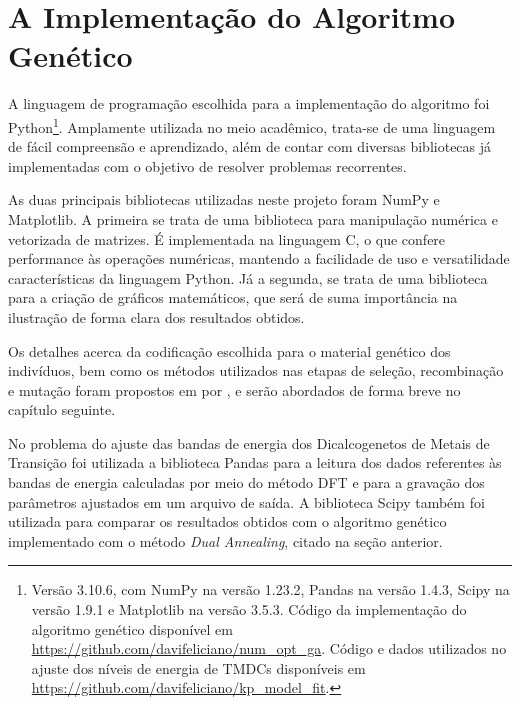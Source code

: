 \section{A Implementação do Algoritmo Genético}

A linguagem de programação escolhida para a implementação do algoritmo foi Python\footnote{
  Versão 3.10.6, com NumPy na versão 1.23.2, Pandas na versão 1.4.3, Scipy na versão 1.9.1 e Matplotlib na versão 3.5.3.
  Código da implementação do algoritmo genético disponível em \url{https://github.com/davifeliciano/num_opt_ga}.
  Código e dados utilizados no ajuste dos níveis de energia de TMDCs disponíveis em \url{https://github.com/davifeliciano/kp_model_fit}.
}. Amplamente utilizada no meio 
acadêmico, trata-se de uma linguagem de fácil compreensão e aprendizado, além de contar com diversas bibliotecas
já implementadas com o objetivo de resolver problemas recorrentes.

As duas principais bibliotecas utilizadas neste projeto foram NumPy e Matplotlib. 
A primeira se trata de uma biblioteca para manipulação numérica e vetorizada de matrizes. É implementada na linguagem C, 
o que confere performance às operações numéricas, mantendo a facilidade de uso e versatilidade características da linguagem
Python. Já a segunda, se trata de uma biblioteca para a criação de gráficos matemáticos, que será de suma importância
na ilustração de forma clara dos resultados obtidos.

Os detalhes acerca da codificação escolhida para o material genético dos indivíduos, bem como os métodos utilizados
nas etapas de seleção, recombinação e mutação foram propostos em \citeyear{roncaratti2006ga} por \citeauthor{roncaratti2006ga},
e serão abordados de forma breve no capítulo seguinte.

No problema do ajuste das bandas de energia dos Dicalcogenetos de Metais de
Transição foi utilizada a biblioteca Pandas para a leitura dos dados
referentes às bandas de energia calculadas por meio do método DFT e para a
gravação dos parâmetros ajustados em um arquivo de saída. A biblioteca Scipy
também foi utilizada para comparar os resultados obtidos com o algoritmo
genético implementado com o método \textit{Dual Annealing}, citado na seção anterior.